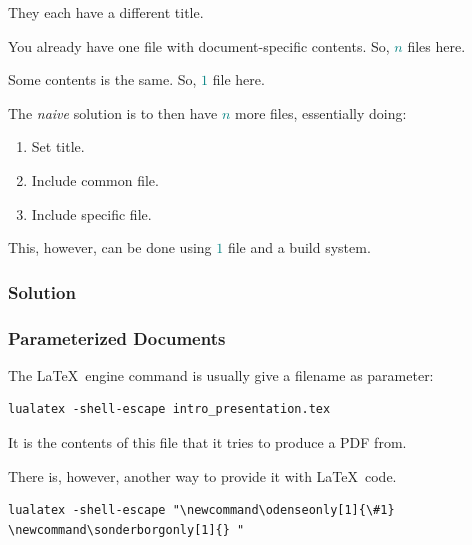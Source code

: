 {\begin{frame}[fragile]
  \vspace{5mm}
  They each have a different title.
  
  \vspace{5mm}
  You already have one file with document-specific contents. So, \textcolor{teal}{$n$} files here.
  
  \vspace{5mm}
  Some contents is the same. So, \textcolor{teal}{$1$} file here.
  
  \vspace{5mm}
  The \textsl{naive} solution is to then have \textcolor{teal}{$n$} more files, essentially doing:
  \begin{enumerate}
    \item Set title.
    \item Include common file.
    \item Include specific file.
  \end{enumerate}
  
  \vspace{3mm}
  This, however, can be done using \textcolor{teal}{$1$} file and a build system.
\end{frame}

\subsubsection{Solution}
\begin{frame}[fragile]
  \frametitle{Parameterized Documents }
  \vspace{3mm}
  The \LaTeX\ engine command is usually give a filename as parameter:
  
  \vspace{1mm}
  \begin{verbatim}
lualatex -shell-escape intro_presentation.tex
  \end{verbatim}
  
  \vspace{5mm}
  It is the contents of this file that it tries to produce a PDF from.
  
  \pause
  \vspace{5mm}
  There is, however, another way to provide it with \LaTeX\ code.
  
  \vspace{1mm}
  \begin{verbatim}
lualatex -shell-escape "\newcommand\odenseonly[1]{\#1} \newcommand\sonderborgonly[1]{} "
  \end{verbatim}
  

\end{frame}}
